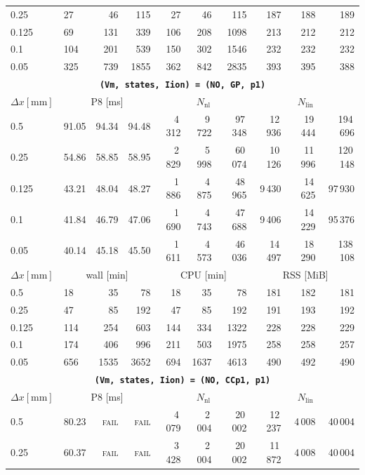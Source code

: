 \documentclass[11pt,a4paper]{article}
\newcommand{\code}[1]{\texttt{\small #1}}
\begin{document}
\begin{center}
\begin{longtable}{l|lrr|rrr|rrr}
0.25 & 27 & 46 & 115 & 27 & 46 & 115 & 187 & 188 & 189\\
0.125 & 69 & 131 & 339 & 106 & 208 & 1098 & 213 & 212 & 212\\
0.1 & 104 & 201 & 539 & 150 & 302 & 1546 & 232 & 232 & 232\\
0.05 & 325 & 739 & 1855 & 362 & 842 & 2835 & 393 & 395 & 388\\
\hline
\hline
\multicolumn{10}{c}{\textbf{\code{(Vm, states, Iion) = (NO, GP, p1)}}}\\\hline
$ \Delta x [\text{mm}] $ & \multicolumn{3}{c|}{P8 [ms]} & \multicolumn{3}{c|}{$N_{\mathrm{nl}}$} & \multicolumn{3}{c|}{$N_{\mathrm{lin}}$}\\
0.5 & 91.05 & 94.34 & 94.48 & 4\,312 & 9\,722 & 97\,348 & 12\,936 & 19\,444 & 194\,696\\
0.25 & 54.86 & 58.85 & 58.95 & 2\,829 & 5\,998 & 60\,074 & 10\,126 & 11\,996 & 120\,148\\
0.125 & 43.21 & 48.04 & 48.27 & 1\,886 & 4\,875 & 48\,965 & 9\,430 & 14\,625 & 97\,930\\
0.1 & 41.84 & 46.79 & 47.06 & 1\,690 & 4\,743 & 47\,688 & 9\,406 & 14\,229 & 95\,376\\
0.05 & 40.14 & 45.18 & 45.50 & 1\,611 & 4\,573 & 46\,036 & 14\,497 & 18\,290 & 138\,108\\
\hline
$ \Delta x [\text{mm}] $ & \multicolumn{3}{c|}{wall [min]} & \multicolumn{3}{c|}{CPU [min]} & \multicolumn{3}{c|}{RSS [MiB]}\\
0.5 & 18 & 35 & 78 & 18 & 35 & 78 & 181 & 182 & 181\\
0.25 & 47 & 85 & 192 & 47 & 85 & 192 & 191 & 193 & 192\\
0.125 & 114 & 254 & 603 & 144 & 334 & 1322 & 228 & 228 & 229\\
0.1 & 174 & 406 & 996 & 211 & 503 & 1975 & 258 & 258 & 257\\
0.05 & 656 & 1535 & 3652 & 694 & 1637 & 4613 & 490 & 492 & 490\\
\hline
\hline
\multicolumn{10}{c}{\textbf{\code{(Vm, states, Iion) = (NO, CCp1, p1)}}}\\\hline
$ \Delta x [\text{mm}] $ & \multicolumn{3}{c|}{P8 [ms]} & \multicolumn{3}{c|}{$N_{\mathrm{nl}}$} & \multicolumn{3}{c|}{$N_{\mathrm{lin}}$}\\
0.5 & 80.23 & \textsc{fail} & \textsc{fail} & 4\,079 & 2\,004 & 20\,002 & 12\,237 & 4\,008 & 40\,004\\
0.25 & 60.37 & \textsc{fail} & \textsc{fail} & 3\,428 & 2\,004 & 20\,002 & 11\,872 & 4\,008 & 40\,004\\

\end{longtable}
\end{center}
\end{document}
